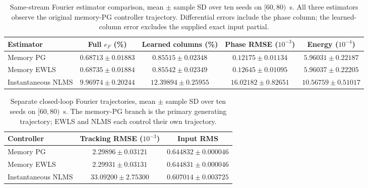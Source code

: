 \begin{table}[t]
\centering
\caption{Same-stream Fourier estimator comparison, mean $\pm$ sample SD over ten seeds on $[60,80)$~s. All three estimators observe the original memory-PG controller trajectory. Differential errors include the phase column; the learned-column error excludes the supplied exact input partial.}
\begin{tabular}{lcccc}
\toprule
Estimator & Full $e_F$ (\%) & Learned columns (\%) & Phase RMSE ($10^{-3}$) & Energy ($10^{-4}$)\\
\midrule
Memory PG & $0.68713\pm0.01883$ & $0.85515\pm0.02348$ & $0.12175\pm0.01134$ & $5.96031\pm0.22187$\\
Memory EWLS & $0.68735\pm0.01884$ & $0.85542\pm0.02349$ & $0.12645\pm0.01095$ & $5.96037\pm0.22205$\\
Instantaneous NLMS & $9.96974\pm0.20244$ & $12.39894\pm0.25955$ & $16.02182\pm0.82651$ & $10.56759\pm0.51017$\\
\bottomrule
\end{tabular}
\label{tab:estimator_same_stream}
\end{table}

\begin{table}[t]
\centering
\caption{Separate closed-loop Fourier trajectories, mean $\pm$ sample SD over ten seeds on $[60,80)$~s. The memory-PG branch is the primary generating trajectory; EWLS and NLMS each control their own trajectory.}
\setlength{\tabcolsep}{4pt}
\begin{tabular}{lcc}
\toprule
Controller & Tracking RMSE ($10^{-3}$) & Input RMS\\
\midrule
Memory PG & $2.29896\pm0.03121$ & $0.644832\pm0.000046$\\
Memory EWLS & $2.29931\pm0.03131$ & $0.644831\pm0.000046$\\
Instantaneous NLMS & $33.09200\pm2.75300$ & $0.607014\pm0.003725$\\
\bottomrule
\end{tabular}
\label{tab:estimator_closed_loop}
\end{table}
